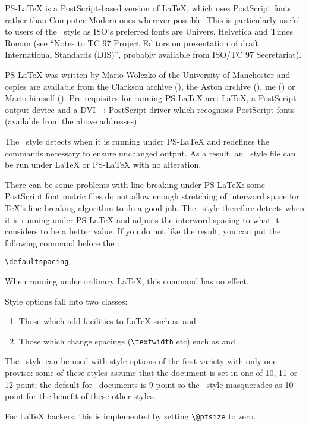 PS-LaTeX is a PostScript-based version of LaTeX, which uses PostScript
fonts rather than Computer Modern ones wherever possible.
This is particularly useful to users of the \iso\ style as ISO's preferred
fonts are Univers, Helvetica and Times Roman (see ``Notes to TC 97 Project
Editors on presentation of draft International Standards (DIS)'', probably
available from ISO/TC 97 Secretariat).

PS-LaTeX was written by Mario Wolczko of the University of Manchester
and copies are available from
the Clarkson archive (),
the Aston archive (),
me () or 
Mario himself ().
Pre-requisites for running PS-LaTeX are: LaTeX, a PostScript output
device and a DVI$\rightarrow$PostScript driver which recognises PostScript fonts
(available from the above addresses).

The \iso\ style detects when it is running under PS-LaTeX and redefines
the commands necessary to ensure unchanged output.
As a result, an \iso\ style file can be run under LaTeX or PS-LaTeX
with no alteration.

\label{misc.pslatex.lines}
There can be some problems with line breaking under PS-LaTeX: some
PostScript font metric files do not allow enough stretching of interword
space for TeX's line breaking algorithm to do a good job.
The \iso\ style therefore detects when it is running under PS-LaTeX and
adjusts the interword spacing to what it considers to be a better value.
If you do not like the result, you can put the following command before the
\verb||:
\begin{verbatim}
\defaultspacing
\end{verbatim}
When running under ordinary LaTeX, this command has no effect.

\label{compat.style}
Style options fall into two classes:
\begin{enumerate}
\item Those which add facilities to LaTeX such as  and
    .
\item Those which change spacings (\verb|\textwidth| etc) such as
     and .
\end{enumerate}

The \iso\ style can be used with style options of the first variety
with only one proviso: some of these styles assume that the document is
set in one of 10, 11 or 12 point; the default for \iso\ documents is
9 point so the \iso\ style masquerades as 10 point for the benefit of
these other styles.
\begin{note}
For LaTeX hackers: this is implemented by setting \verb|\@ptsize| to
zero.
\end{note}

